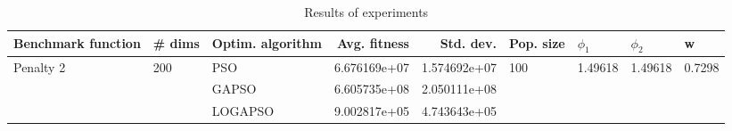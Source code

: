 \begin{table}
\centering
\caption{Results of experiments}
\begin{tabular}{lllrrllll}
\toprule
        Benchmark function &              \# dims & Optim. algorithm &  Avg. fitness &    Std. dev. &            Pop. size &               $\phi_{1}$ &               $\phi_{2}$ &                       w \\
\midrule
\multirow{3}{*}{Penalty 2} & \multirow{3}{*}{200} &              PSO &  6.676169e+07 & 1.574692e+07 & \multirow{3}{*}{100} & \multirow{3}{*}{1.49618} & \multirow{3}{*}{1.49618} & \multirow{3}{*}{0.7298} \\
                           &                      &            GAPSO &  6.605735e+08 & 2.050111e+08 &                      &                          &                          &                         \\
                           &                      &          LOGAPSO &  9.002817e+05 & 4.743643e+05 &                      &                          &                          &                         \\
\bottomrule
\end{tabular}
\end{table}
